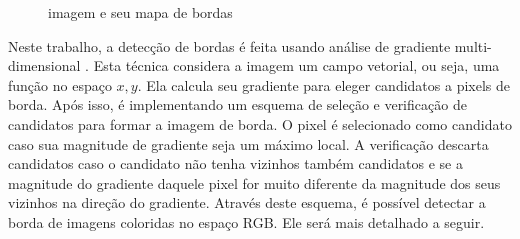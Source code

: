 

\begin{figure}[h]
  \centering
  \hfill
  \caption{imagem e seu mapa de bordas}
  \label{exemploborda}
\end{figure}


Neste trabalho, a detecção de bordas é feita usando análise de gradiente multi-dimensional \cite{borda00}. Esta técnica considera a imagem um campo vetorial, ou seja, uma função no espaço $x,y$. Ela calcula seu gradiente para eleger candidatos a pixels de borda. Após isso, é implementando um esquema de seleção e verificação de candidatos para formar a imagem de borda. O pixel é selecionado como candidato caso sua magnitude de gradiente seja um máximo local. A verificação descarta candidatos caso o candidato não tenha vizinhos também candidatos e se a magnitude do gradiente daquele pixel for muito diferente da magnitude dos seus vizinhos na direção do gradiente.
Através deste esquema, é possível detectar a borda de imagens coloridas no espaço RGB. Ele será mais detalhado a seguir.


